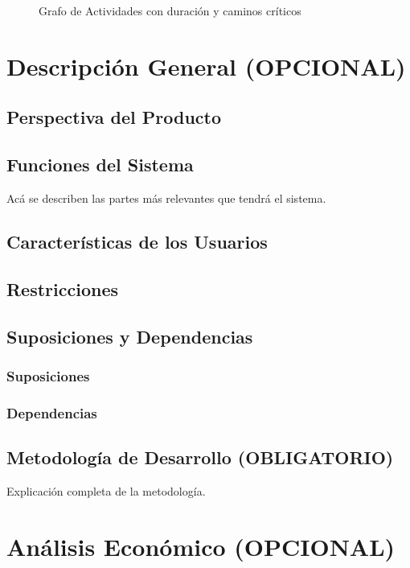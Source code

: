 \documentclass[letter,12pt]{report}
\newcommand\rojo[1]{\textcolor[rgb]{1,0,0}{#1}}
\begin{document}
\begin{landscape}
\begin{figure}[hbt]
  \centering
  \caption{Grafo de Actividades con duración y caminos críticos}
  \label{CPMcritico}
\end{figure}
\end{landscape}




\chapter{Descripción General (\rojo{OPCIONAL})}\label{descripcion}
\section{Perspectiva del Producto}
\section{Funciones del Sistema}
Acá se describen las partes más relevantes que tendrá el sistema.
\section{Características de los Usuarios}
\section{Restricciones}
\section{Suposiciones y Dependencias}
\subsection{Suposiciones}
\subsection{Dependencias}
\section{Metodología de Desarrollo (\rojo{OBLIGATORIO})}
Explicación completa de la metodología.

\chapter{Análisis Económico (\rojo{OPCIONAL})}\label{economico}
\end{document}
